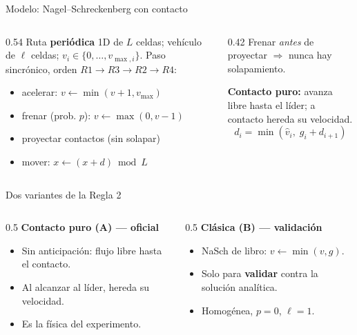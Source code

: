 \documentclass[10pt,aspectratio=169]{beamer}
\begin{document}
\begin{frame}{Modelo: Nagel--Schreckenberg con contacto}
\begin{columns}[T]
\begin{column}{0.54\textwidth}
Ruta \textbf{periódica} 1D de $L$ celdas; vehículo de $\ell$ celdas; $v_i\in\{0,\dots,v_{\max,i}\}$.
Paso sincrónico, orden $R1\to R3\to R2\to R4$:
\begin{itemize}\small
  \item[R1] acelerar: $v\leftarrow\min(v+1,v_{\max})$
  \item[R3] frenar (prob. $p$): $v\leftarrow\max(0,v-1)$
  \item[R2] proyectar contactos (sin solapar)
  \item[R4] mover: $x\leftarrow(x+d)\bmod L$
\end{itemize}
\end{column}
\begin{column}{0.42\textwidth}
\footnotesize
Frenar \emph{antes} de proyectar $\Rightarrow$ nunca hay solapamiento.
\medskip

\textbf{Contacto puro:} avanza libre hasta el líder; a contacto hereda su velocidad.
\[ d_i=\min(\hat v_i,\; g_i+d_{i+1}) \]
\end{column}
\end{columns}
\end{frame}

\begin{frame}{Dos variantes de la Regla 2}
\begin{columns}[T]
\begin{column}{0.5\textwidth}
\textbf{Contacto puro (A) --- oficial}
\begin{itemize}\small
  \item Sin anticipación: flujo libre hasta el contacto.
  \item Al alcanzar al líder, hereda su velocidad.
  \item Es la física del experimento.
\end{itemize}
\end{column}
\begin{column}{0.5\textwidth}
\textbf{Clásica (B) --- validación}
\begin{itemize}\small
  \item NaSch de libro: $v\leftarrow\min(v,g)$.
  \item Solo para \textbf{validar} contra la solución analítica.
  \item Homogénea, $p=0$, $\ell=1$.
\end{itemize}
\end{column}
\end{columns}
\end{frame}
\end{document}

